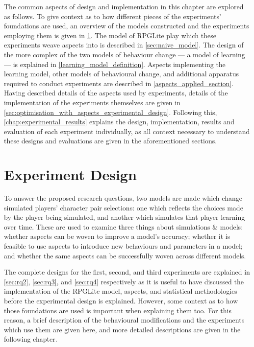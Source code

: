 The common aspects of design and implementation in this chapter are explored as
follows. To give context as to how different pieces of the experiments'
foundations are used, an overview of the models constructed and the experiments
employing them is given in \cref{experiment_design_sec_models_and_experiments}.
The model of RPGLite play which these experiments weave aspects into is
described in \cref{sec:naive_model}. The design of the more complex of the two
models of behaviour change --- a model of learning --- is explained in
\cref{learning_model_definition}. Aspects implementing the learning model, other
models of behavioural change, and additional apparatus required to conduct
experiments are described in \cref{aspects_applied_section}. Having described
details of the aspects used by experiments, details of the implementation of the
experiments themselves are given in
\cref{sec:optimisation_with_aspects_experimental_design}. Following this,
\cref{chap:experimental_results} explains the design, implementation, results
and evaluation of each experiment individually, as all context necessary to
understand these designs and evaluations are given in the aforementioned
sections.

\section{Experiment Design}
\label{experiment_design_sec_models_and_experiments}

To answer the proposed research questions, two models are made which change
simulated players' character pair selections: one which reflects the choices
made by the player being simulated, and another which simulates that player
learning over time. These are used to examine three things about
\aspectoriented{} simulations \& models: whether aspects can be woven to improve
a model's accuracy; whether it is feasible to use aspects to introduce new
behaviours and parameters in a model; and whether the same aspects can be
successfully woven across different models.


The complete designs for the first, second, and third experiments are explained
in \cref{sec:rq2}, \cref{sec:rq3}, and \cref{sec:rq4} respectively as it is
useful to have discussed the implementation of the RPGLite model, aspects, and
statistical methodologies before the experimental design is explained. However,
some context as to how those foundations are used is important when explaining
them too. For this reason, a brief description of the behavioural modifications
and the experiments which use them are given here, and more detailed
descriptions are given in the following chapter.

